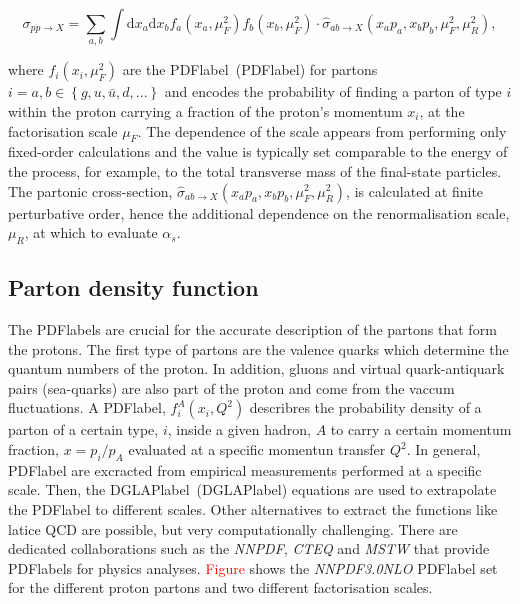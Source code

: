 \begin{equation}
    \sigma_{pp\to X}=\sum_{a,b}\int \text{d}x_a\text{d}x_b f_a(x_a,\mu_F^2)f_b(x_b,\mu_F^2)\cdot\hat{\sigma}_{ab\to X}(x_a p_a,x_b p_b,\mu_F^2,\mu_R^2),
\end{equation}

where $f_i(x_i,\mu_F^2)$ are the \acrlong{PDFlabel}~(\acrshort{PDFlabel}) for partons $i=a,b\in\left\{g, u, \bar{u}, d, ...\right\}$ and encodes the probability of finding a parton of type $i$ within the proton carrying a fraction of the proton's momentum $x_i$, at the factorisation scale $\mu_F$. The dependence of the scale appears from performing only fixed-order calculations and the value is typically set comparable to the energy of the process, for example, to the total transverse mass of the final-state particles. The partonic cross-section, $\hat{\sigma}_{ab\to X}(x_a p_a,x_b p_b,\mu_F^2,\mu_R^2)$, is calculated at finite perturbative order, hence the additional dependence on the renormalisation scale, $\mu_R$, at which to evaluate $\alpha_s$.

\subsection{Parton density function}

The \acrshort{PDFlabel}s are crucial for the accurate description of the partons that form the protons. The first type of partons are the valence quarks which determine the quantum numbers of the proton. In addition, gluons and virtual quark-antiquark pairs (sea-quarks) are also part of the proton and come from the vaccum fluctuations. A \acrshort{PDFlabel}, $f_i^A(x_i,Q^2)$ describres the probability density of a parton of a certain type, $i$, inside a given hadron, $A$ to carry a certain momentum fraction, $x=p_i/p_A$ evaluated at a specific momentun transfer $Q^2$. In general, \acrshort{PDFlabel} are excracted from empirical measurements performed at a specific scale. Then, the \acrlong{DGLAPlabel}~(\acrshort{DGLAPlabel}) equations are used to extrapolate the \acrshort{PDFlabel} to different scales. Other alternatives to extract the functions like latice \acrshort{QCD} are possible, but very computationally challenging. %
There are dedicated collaborations such as the \textit{NNPDF}, \textit{CTEQ} and \textit{MSTW} that provide %
 \acrshort{PDFlabel}s for physics analyses. \textcolor{red}{Figure} shows the \textit{NNPDF3.0NLO} \acrshort{PDFlabel} set for the different proton partons and two different factorisation scales.

